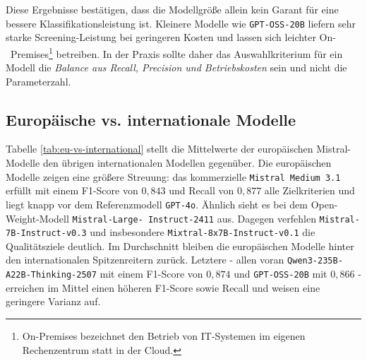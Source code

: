 Diese Ergebnisse bestätigen, dass die Modellgröße allein kein Garant für eine bessere Klassifikationsleistung ist. Kleinere Modelle wie \texttt{GPT-OSS-20B} liefern sehr starke Screening-Leistung bei geringeren Kosten und lassen sich leichter On-\linebreak~Premises\footnote{
On-Premises bezeichnet den Betrieb von IT-Systemen im eigenen Rechenzentrum statt in der Cloud.
} betreiben. In der Praxis sollte daher das Auswahlkriterium für ein Modell die \emph{Balance aus Recall, Precision und Betriebskosten} sein und nicht die Parameterzahl.

\subsection*{Europäische vs. internationale Modelle}

Tabelle \ref{tab:eu-vs-international} stellt die Mittelwerte der europäischen Mistral-Modelle den übrigen internationalen Modellen gegenüber. Die europäischen Modelle zeigen eine größere Streuung: das kommerzielle \texttt{Mistral Medium 3.1} erfüllt mit einem F1-Score von $0{,}843$ und Recall von $0{,}877$ alle Zielkriterien und liegt knapp vor dem Referenzmodell \texttt{GPT-4o}. Ähnlich sieht es bei dem Open-Weight-Modell \texttt{Mistral-Large-\linebreak~Instruct-2411} aus. Dagegen verfehlen \texttt{Mistral-7B-Instruct-v0.3} und insbesondere \texttt{Mixtral-8x7B-Instruct-v0.1} die Qualitätsziele deutlich. Im Durchschnitt bleiben die europäischen Modelle hinter den internationalen Spitzenreitern zurück. Letztere - allen voran \texttt{Qwen3-235B-A22B-Thinking-2507} mit einem F1-Score von $0{,}874$ und \texttt{GPT-OSS-20B} mit $0{,}866$ - erreichen im Mittel einen höheren F1-Score sowie Recall und weisen eine geringere Varianz auf.

